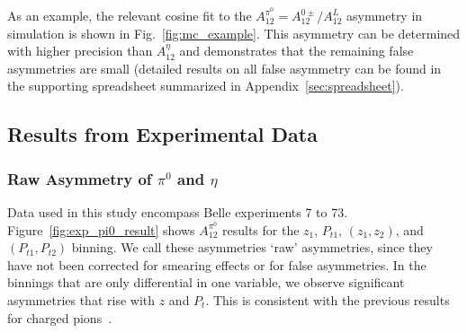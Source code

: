 As an example, the relevant cosine fit to the $A_{12}^{\pi^0}=A_{12}^{0\pm}/A_{12}^L$ asymmetry in simulation is shown in Fig.~\ref{fig:mc_example}. 
This asymmetry can be determined with  higher precision than $A_{12}^{\eta}$ and demonstrates that the remaining false asymmetries are small (detailed results on all false asymmetry can be found in the supporting spreadsheet summarized in Appendix~\ref{sec:spreadsheet}).




\subsection{Results from Experimental Data}
\label{sec:resultsfromexp}
\subsubsection{\texorpdfstring{Raw Asymmetry of $\pi^0$ and $\eta$}{Raw Asymmetry of pi0 and eta}}
Data used in this study encompass Belle experiments  7 to 73.
Figure~\ref{fig:exp_pi0_result} shows  $A_{12}^{\pi^0}$ results for the $z_1$, $P_{t1}$, $(z_1,z_2)$, and $(P_{t1},P_{t2})$ binning. We call these asymmetries `raw' asymmetries, since they have not been corrected for smearing effects or for false asymmetries. 
In the binnings that are only differential in one variable, we observe significant asymmetries that rise with $z$ and $P_{t}$. This is consistent with the previous results for charged pions~\cite{ChargedPionResult2, ChargedPionResult}.

